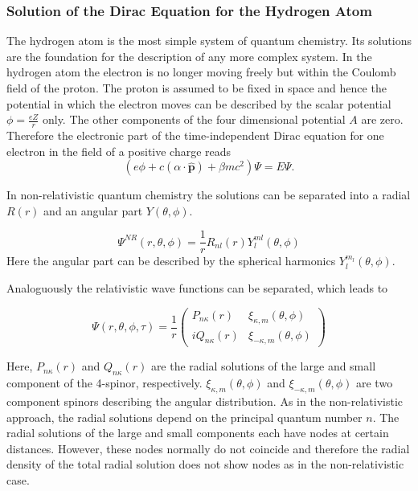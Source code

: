 \subsubsection{Solution of the Dirac Equation for the Hydrogen Atom}\label{hatom}
The hydrogen atom is the most simple system of quantum chemistry. Its solutions
are the foundation for the description of any more complex system.
In the hydrogen atom the electron is no longer moving freely but within the Coulomb
field of the proton. The proton is assumed to be fixed in space and hence the
potential in which the electron moves can be described by the scalar potential
$\phi=\frac{eZ}r$ only. The other components of the four dimensional potential $A$
are zero. Therefore the electronic part of the time-independent Dirac equation
for one electron in the field of a positive charge reads
\begin{equation}
\left(e\phi + c(\alpha\cdot\hat{\mathbf{p}})+\beta mc^2\right) \Psi = E \Psi.
\end{equation}

In non-relativistic quantum chemistry the solutions can be separated into a radial
$R(r)$ and an angular part $Y(\theta,\phi)$.

\begin{equation}
\Psi^{NR}(r,\theta,\phi) = \frac1r R_{nl}(r)Y^{ml}_l(\theta,\phi)
\end{equation}
Here the angular part can be described by the spherical harmonics
$Y_l^{m_l}(\theta,\phi)$.

Analoguously the relativistic wave functions can be separated, which leads to

\begin{equation}\label{seprel}
\Psi(r,\theta,\phi,\tau) = \frac1r \left( \begin{array}{rl}
P_{n\kappa}(r)  & \xi_{\kappa,m}(\theta,\phi)\\
iQ_{n\kappa}(r) & \xi_{-\kappa,m}(\theta,\phi)
\end{array}\right)
\end{equation}

Here, $P_{n\kappa}(r)$ and $Q_{n\kappa}(r)$ are the radial solutions of the
large and small component of the 4-spinor, respectively. $\xi_{\kappa,m}(\theta,\phi)$
and $\xi_{-\kappa,m}(\theta,\phi)$ are two component spinors describing the
angular distribution. As in the non-relativistic approach, the radial solutions
depend on the principal quantum number $n$. The radial solutions of the large and
small components each have nodes at certain distances. However, these nodes
normally do not coincide and therefore the radial density of the total radial
solution does not show nodes as in the non-relativistic case.

